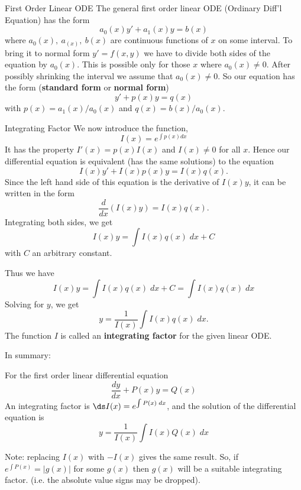 \begin{frame}{First Order Linear ODE}
 The general first order linear ODE (Ordinary Diff'l Equation) has the form
$$a_0(x)y'+a_1(x)y=b(x)$$
where $a_0(x),\ a_(x),\ b(x)$ are continuous functions of $x$ on some interval.
To bring it to normal form $y'=f(x,y)$  we have to divide both sides of the equation by $a_0(x)$. This is possible only for those $x$ where $a_0(x)\ne 0$.
After possibly shrinking the interval we assume that $a_0(x)\ne 0$. So our equation
has the form (\textbf{standard form} or \textbf{normal form})
$$y'+p(x)y=q(x)$$
with $p(x)=a_1(x)/a_0(x)$ and $q(x)=b(x)/a_0(x)$. 
\end{frame}


\begin{frame}{Integrating Factor}
We now introduce the function,
$$I(x)=e^{\int p(x)dx}$$
It has the property $I'(x)=p(x)I(x)$ and $I(x)\ne 0$ for all
$x$. Hence our differential equation is equivalent (has the same
solutions) to the equation
$$I(x)y'+I(x)p(x)y=I(x)q(x).$$ \pause 
Since the left hand side of this equation is the derivative of $I(x)y$, it
can be written in the form
$$\frac{d}{dx}(I(x)y)=I(x)q(x).$$ \pause 
Integrating both sides, we get
$$I(x)y=\int I(x)q(x)\; dx + C$$
with $C$ an arbitrary constant.
\end{frame}


\begin{frame}
Thus we have 
$$I(x)y=\int I(x)q(x)\; dx + C=\int I(x)q(x)\; dx$$ \pause 
 Solving for $y$, we get
$$y=\frac{1}{I(x)}\int I(x)q(x)\;dx.$$
The function $I$ is called an {\bf integrating factor} for the
given linear ODE.
\end{frame}



\begin{frame}
In summary:
\begin{theorem}
For the first order linear differential equation
\[
  \frac{dy}{dx}+P(x)y=Q(x)
\]
An integrating factor is $\ds I(x)=e^{\int P(x)\;dx}$, and the solution of the differential equation is  
\[
y=\frac{1}{I(x)}\int I(x)Q(x)\;dx
\]  
\end{theorem}

Note: replacing $I(x)$ with $-I(x)$ gives the same result. So, if $e^{\int P(x)}=|g(x)|$ for some $g(x)$ then $g(x)$ will be a suitable integrating factor.  (i.e. the absolute value signs may be dropped).\\                                      


\end{frame}



